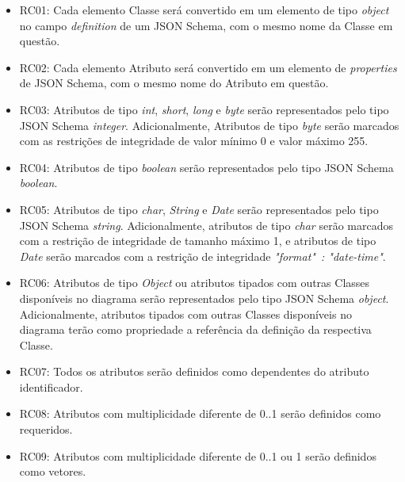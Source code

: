 \begin{itemize}
    \item RC01: Cada elemento Classe será convertido em um elemento de tipo \textit{object} no campo \textit{definition} de um JSON Schema, com o mesmo nome da Classe em questão.
    
    \item RC02: Cada elemento Atributo será convertido em um elemento de \textit{properties} de JSON Schema, com o mesmo nome do Atributo em questão.
    
    \item RC03: Atributos de tipo \textit{int}, \textit{short}, \textit{long} e \textit{byte} serão representados pelo tipo JSON Schema \textit{integer}. Adicionalmente, Atributos de tipo \textit{byte} serão marcados com as restrições de integridade de valor mínimo 0 e valor máximo 255.
    
    \item RC04: Atributos de tipo \textit{boolean} serão representados pelo tipo JSON Schema \textit{boolean}.
    
    \item RC05: Atributos de tipo \textit{char}, \textit{String} e \textit{Date} serão representados pelo tipo JSON Schema \textit{string}. Adicionalmente, atributos de tipo \textit{char} serão marcados com a restrição de integridade de tamanho máximo 1, e atributos de tipo \textit{Date} serão marcados com a restrição de integridade \textit{"format"\ : "date-time"}.
    
    \item RC06: Atributos de tipo \textit{Object} ou atributos tipados com outras Classes disponíveis no diagrama serão representados pelo tipo JSON Schema \textit{object}. Adicionalmente, atributos tipados com outras Classes disponíveis no diagrama terão como propriedade a referência da definição da respectiva Classe.
    
    \item RC07: Todos os atributos serão definidos como dependentes do atributo identificador.
    
    \item RC08: Atributos com multiplicidade diferente de 0..1 serão definidos como requeridos.
    
    \item RC09: Atributos com multiplicidade diferente de 0..1 ou 1 serão definidos como vetores.
\end{itemize}


